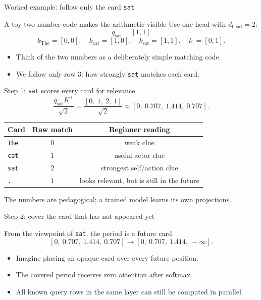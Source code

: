 \documentclass[aspectratio=169,11pt]{beamer}
\newcommand{\smallnote}[1]{\textcolor{HUSTGray}{\footnotesize #1}}
\begin{document}
\begin{frame}{Worked example: follow only the card \texttt{sat}}
  \begin{block}{A toy two-number code makes the arithmetic visible}
    Use one head with \(d_{\text{head}}=2\):
    \[
      q_{\text{sat}}=[1,1]
    \]
    \[
      k_{\text{The}}=[0,0],\quad k_{\text{cat}}=[1,0],\quad
      k_{\text{sat}}=[1,1],\quad k_{\text{.}}=[0,1].
    \]
  \end{block}
  \begin{itemize}
    \item Think of the two numbers as a deliberately simple matching code.
    \item We follow only row 3: how strongly \texttt{sat} matches each card.
  \end{itemize}
\end{frame}

\begin{frame}{Step 1: \texttt{sat} scores every card for relevance}
  \[
    \frac{q_{\text{sat}}K^\top}{\sqrt{2}}
    =
    \frac{[0,\ 1,\ 2,\ 1]}{\sqrt{2}}
    \approx
    [0,\ 0.707,\ 1.414,\ 0.707].
  \]
  \begin{center}
    \begin{tabular}{lcc}
      \toprule
      Card & Raw match & Beginner reading \\
      \midrule
      \texttt{The} & \(0\) & weak clue \\
      \texttt{cat} & \(1\) & useful actor clue \\
      \texttt{sat} & \(2\) & strongest self/action clue \\
      \texttt{.} & \(1\) & looks relevant, but is still in the future \\
      \bottomrule
    \end{tabular}
  \end{center}
  \vspace{0.2cm}
  \smallnote{The numbers are pedagogical; a trained model learns its own projections.}
\end{frame}

\begin{frame}{Step 2: cover the card that has not appeared yet}
  \begin{block}{From the viewpoint of \texttt{sat}, the period is a future card}
    \[
      [0,\ 0.707,\ 1.414,\ 0.707]
      \longrightarrow
      [0,\ 0.707,\ 1.414,\ -\infty].
    \]
  \end{block}
  \begin{itemize}
    \item Imagine placing an opaque card over every future position.
    \item The covered period receives zero attention after softmax.
    \item All known query rows in the same layer can still be computed in parallel.
  \end{itemize}
\end{frame}
\end{document}

